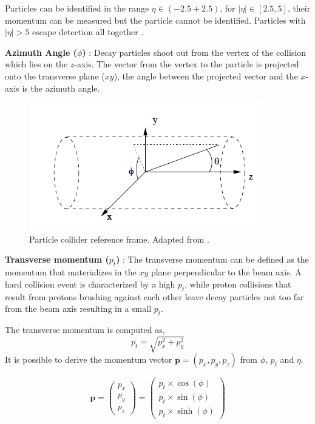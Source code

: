 Particles can be identified in the range $\eta \in (-2.5 +2.5)$, for $|\eta| \in [2.5,5]$, their momentum can be measured but the particle cannot be identified. Particles with $|\eta| > 5$ escape detection all together \cite{rm}. 

\textbf{Azimuth Angle ($\phi$)} : Decay particles shoot out from the vertex of the collision which lies on the $z$-axis. The vector from the vertex to the particle is projected onto the transverse plane ($xy$), the angle between the projected vector and the $x$-axis is the azimuth angle. 

\begin{figure}
\begin{center}
\includegraphics[scale=0.6]{images/reference.png}
\caption{Particle collider reference frame. Adapted from \cite{rm}.}
\end{center}
\end{figure}

\textbf{Transverse momentum  ($p_{t}$)} : The transverse momentum can be defined as the momentum that materializes in the $xy$ plane perpendicular to the beam axis. A hard collision event is characterized by a high $p_{t}$, while proton collisions that result from protons brushing against each other leave decay particles not too far from the beam axis resulting in a small $p_{t}$. 

The transverse momentum is computed as, $$ p_{t} = \sqrt{p_{x}^2 + p_{y}^2}$$
It is possible to derive the momentum vector $\mathbf{p} = (p_{x},p_{y},p_{z})$ from $\phi$, $p_{t}$ and $\eta$.

\begin{equation}
\mathbf{p} =  \left( \begin{aligned} p_{x} \\p_{y} \\p_{z}  \end{aligned} \right) = \left( \begin{aligned} p_{t} \times \cos(\phi) \\ 
									p_{t} \times \sin(\phi) \\ p_{t} \times \sinh(\phi) \end{aligned} \right)
\end{equation}

